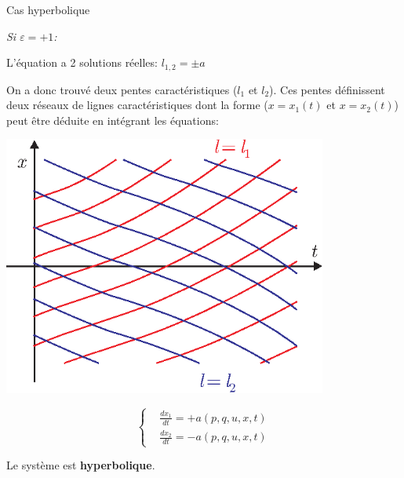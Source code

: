\documentclass[
mode=present,    %
paper=a4paper,   %
orient=landscape,
display=slides,   %
size=10pt,
style=romain   %
]{powerdot}
\begin{document}
\begin{slide}[toc=Cas hyperbolique]{Cas hyperbolique}

\emph{Si $\varepsilon=+1$:}

\bigskip

L'équation a 2 solutions réelles: $\boxed{ l_{1,2}=\pm a }$

\bigskip

On a donc trouvé deux pentes caractéristiques ($l_1$ et $l_2$). Ces pentes définissent deux réseaux de lignes caractéristiques dont la forme ($x=x_1(t)$ et $x=x_2(t)$) peut être déduite en intégrant les équations:

\bigskip

\begin{minipage}[l]{\textwidth/2}
    \centerline{\includegraphics[width=0.8\textwidth]{carac2.eps} }
\end{minipage}
\begin{minipage}[l]{\textwidth/2-1cm}
        \begin{equation*}
            \left\{
            \begin{aligned}
                & \frac{d x_1}{d t} = +a(p,q,u,x,t)   \\
                & \frac{d x_2}{d t} = -a(p,q,u,x,t)
            \end{aligned}
            \right.
        \end{equation*}
\end{minipage}

Le système est \textbf{hyperbolique}.

\end{slide}
\end{document}
